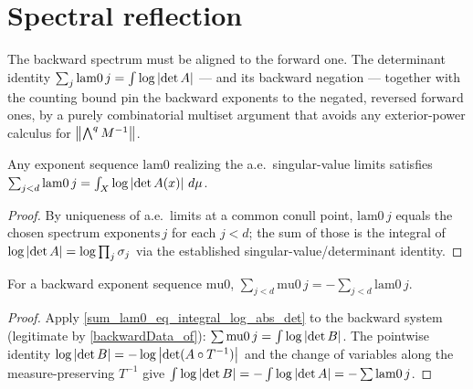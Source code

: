 \section{Spectral reflection}

The backward spectrum must be aligned to the forward one. The determinant identity \(\sum_j \mathrm{lam0}\,j = \int \log\left\lvert \det A \right\rvert\) — and its backward negation — together with the counting bound pin the backward exponents to the negated, reversed forward ones, by a purely combinatorial multiset argument that avoids any exterior-power calculus for \(\left\lVert \textstyle\bigwedge^q M^{-1} \right\rVert\).

\begin{proposition}\label{sum_lam0_eq_integral_log_abs_det}
  \leanok
  Any exponent sequence \(\mathrm{lam0}\) realizing the a.e.\ singular-value limits satisfies \(\sum_{j<d}\mathrm{lam0}\,j = \int_X \log\left\lvert \det A(x) \right\rvert\,d\mu\).
\end{proposition}
\begin{proof}\leanok
  By uniqueness of a.e.\ limits at a common conull point, \(\mathrm{lam0}\,j\) equals the chosen spectrum \(\mathrm{exponents}\,j\) for each \(j < d\); the sum of those is the integral of \(\log\left\lvert \det A \right\rvert = \log\prod_j \sigma_j\) via the established singular-value/determinant identity.
\end{proof}

\begin{proposition}\label{sum_mu0_eq_neg_sum_lam0}
  \leanok
  For a backward exponent sequence \(\mathrm{mu0}\), \(\sum_{j<d}\mathrm{mu0}\,j = -\sum_{j<d}\mathrm{lam0}\,j\).
\end{proposition}
\begin{proof}\leanok
  Apply \cref{sum_lam0_eq_integral_log_abs_det} to the backward system (legitimate by \cref{backwardData_of}): \(\sum \mathrm{mu0}\,j = \int \log\left\lvert \det B \right\rvert\). The pointwise identity \(\log\left\lvert \det B \right\rvert = -\log\left\lvert \det(A\circ T^{-1}) \right\rvert\) and the change of variables along the measure-preserving \(T^{-1}\) give \(\int \log\left\lvert \det B \right\rvert = -\int \log\left\lvert \det A \right\rvert = -\sum \mathrm{lam0}\,j\).
\end{proof}

